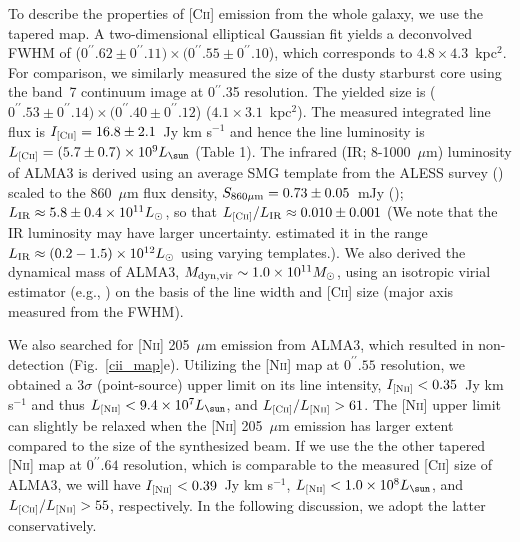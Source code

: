 \documentclass[apj]{emulateapj}
\begin{document}
To describe the properties of \textsc{[Cii]} emission from the whole galaxy, we use the tapered map.
A two-dimensional elliptical Gaussian fit yields a deconvolved FWHM of ($0^{\prime\prime}.62\pm0^{\prime\prime}.11)\times(0^{\prime\prime}.55\pm0^{\prime\prime}.10$), which corresponds to $4.8\times4.3$~kpc$^2$.
For comparison, we similarly measured the size of the dusty starburst core using the band~7 continuum image at 0$^{\prime\prime}$.35 resolution.
The yielded size is ($0^{\prime\prime}.53\pm0^{\prime\prime}.14)\times(0^{\prime\prime}.40\pm0^{\prime\prime}.12$) ($4.1\times3.1$~kpc$^2$).
The measured integrated line flux is $I_\textsc{[Cii]}=16.8\pm2.1$~Jy km s$^{-1}$ and hence the line luminosity is $L_\textsc{[Cii]}=(5.7\pm0.7) \times10^{9} L_\sun$ (Table 1). 
The infrared (IR; 8-1000~$\mu$m) luminosity of ALMA3 is derived using an average SMG template from the ALESS survey (\citealt{2014MNRAS.438.1267S}) scaled to the 860~$\mu$m flux density, $S_{\rm 860 \mu m}=0.73\pm0.05$~mJy (\citealt{2016ApJ...832...37G}); $L_{\rm IR}\approx5.8\pm0.4\times10^{11} L_\odot$, so that $L_\textsc{[Cii]}/L_{\rm IR}\approx0.010\pm0.001$
(We note that the IR luminosity may have larger uncertainty.
\citet{2016ApJ...832...37G} estimated it in the range $L_{\rm IR}\approx(0.2-1.5)\times10^{12} L_\odot$ using varying templates.).
We also derived the dynamical mass of ALMA3, $M_{\rm dyn, vir}\sim 1.0\times10^{11} M_\odot$, using an isotropic virial estimator (e.g., \citealt{2010ApJ...724..233E}) on the basis of the line width and \textsc{[Cii]} size (major axis measured from the FWHM).

We also searched for \textsc{[Nii]} 205~$\mu$m emission from ALMA3, which resulted in non-detection (Fig.~\ref{cii_map}e).
Utilizing the \textsc{[Nii]} map at $0^{\prime\prime}.55$ resolution, we obtained a 3$\sigma$ (point-source) upper limit on its line intensity, $I_\textsc{[Nii]}<0.35$~Jy km s$^{-1}$ and 
thus $L_\textsc{[Nii]}<9.4\times10^{7} L_\sun$, and $L_\textsc{[Cii]}/L_\textsc{[Nii]}>61$.
The \textsc{[Nii]} upper limit can slightly be relaxed when the \textsc{[Nii]} 205~$\mu$m emission has larger extent compared to the size of the synthesized beam.
If we use the the other tapered \textsc{[Nii]} map at $0^{\prime\prime}.64$ resolution, which is comparable to the measured \textsc{[Cii]} size of ALMA3, we will have $I_\textsc{[Nii]}<0.39$~Jy km s$^{-1}$, $L_\textsc{[Nii]}<1.0\times10^{8} L_\sun$, and $L_\textsc{[Cii]}/L_\textsc{[Nii]}>55$, respectively.
In the following discussion, we adopt the latter conservatively.
\end{document}
